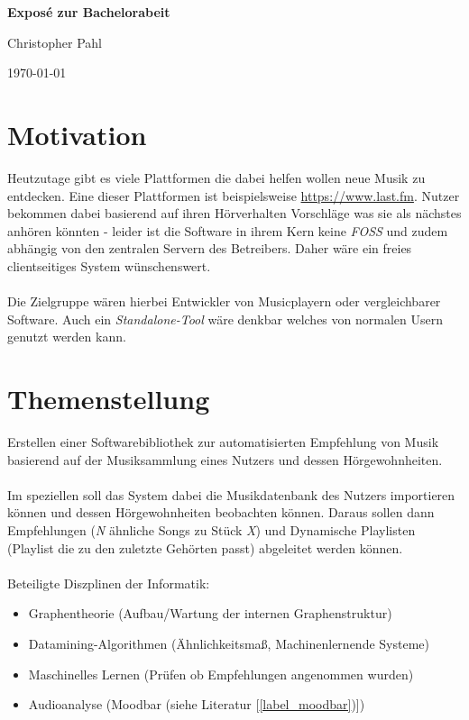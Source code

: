 \documentclass[8pt,a4paper,ngerman]{scrartcl}
\begin{document}
\begin{center}
    \LARGE{\textbf{Exposé zur Bachelorabeit}}
\end{center}
\begin{center}
    \large{Christopher Pahl}
\end{center}
\begin{center}
    \small{\today}
\end{center}

\section{Motivation}
    Heutzutage gibt es viele Plattformen die dabei helfen wollen neue Musik zu
    entdecken. Eine dieser Plattformen ist beispielsweise
    \url{https://www.last.fm}. Nutzer bekommen dabei
    basierend auf ihren Hörverhalten Vorschläge was sie als nächstes anhören
    könnten - leider ist die Software in ihrem Kern keine \emph{FOSS} und zudem
    abhängig von den zentralen Servern des Betreibers. Daher wäre ein freies
    clientseitiges System wünschenswert.
    \\
    \\
    Die Zielgruppe wären hierbei Entwickler von Musicplayern oder vergleichbarer
    Software. Auch ein \emph{Standalone-Tool} wäre denkbar welches von normalen Usern
    genutzt werden kann.

\section{Themenstellung}
    Erstellen einer Softwarebibliothek zur automatisierten Empfehlung von Musik
    basierend auf der Musiksammlung eines Nutzers und dessen Hörgewohnheiten.
    \\
    \\
    Im speziellen soll das System dabei die Musikdatenbank des Nutzers importieren
    können und dessen Hörgewohnheiten beobachten können. Daraus sollen dann
    Empfehlungen (\textit{N} ähnliche Songs zu Stück \textit{X}) und Dynamische Playlisten 
    (Playlist die zu den zuletzte Gehörten passt) abgeleitet werden können.
    \\
    \\
    Beteiligte Diszplinen der Informatik:

    \begin{itemize}
        \item Graphentheorie (Aufbau/Wartung der internen Graphenstruktur)
        \item Datamining-Algorithmen (Ähnlichkeitsmaß, Machinenlernende Systeme)
        \item Maschinelles Lernen (Prüfen ob Empfehlungen angenommen wurden)
        \item Audioanalyse (Moodbar (siehe Literatur [\ref{label_moodbar})])
    \end{itemize}
\end{document}
